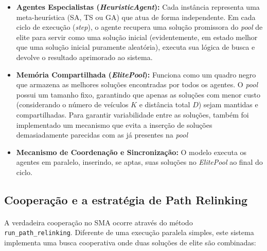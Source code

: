 \begin{itemize}
    \item \textbf{Agentes Especialistas (\textit{HeuristicAgent}):} Cada instância representa uma meta-heurística (SA, TS ou GA) que atua de forma independente. Em cada ciclo de execução (\textit{step}), o agente recupera uma solução promissora do \textit{pool} de elite para servir como uma solução inicial (evidentemente, em estado melhor que uma solução inicial puramente aleatória), executa sua lógica de busca e devolve o resultado aprimorado ao sistema.
    \item \textbf{Memória Compartilhada (\textit{ElitePool}):} Funciona como um quadro negro que armazena as melhores soluções encontradas por todos os agentes. O \textit{pool} possui um tamanho fixo, garantindo que apenas as soluções com menor custo (considerando o número de veículos $K$ e distância total $D$) sejam mantidas e compartilhadas. Para garantir variabilidade entre as soluções, também foi implementado um mecanismo que evita a inserção de soluções demasiadamente parecidas com as já presentes na \textit{pool}
    \item \textbf{Mecanismo de Coordenação e Sincronização:} O modelo executa os agentes em paralelo, inserindo, se aptas, suas soluções no \textit{ElitePool} ao final do ciclo.
\end{itemize}

\subsection{Cooperação e a estratégia de Path Relinking}

\paragraph{} A verdadeira cooperação no SMA ocorre através do método \texttt{run\_path\_relinking}. Diferente de uma execução paralela simples, este sistema implementa uma busca cooperativa onde duas soluções de elite são combinadas:

